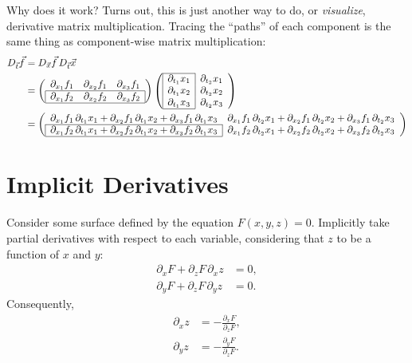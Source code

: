 \documentclass{multi}
\begin{document}
Why does it work? Turns out, this is just another way to do, or \emph{visualize}, derivative matrix multiplication. Tracing the ``paths'' of each component is the same thing as component-wise matrix multiplication:
\begin{align*}
    D_{\vec t}\vec f &= D_{\vec x}\vec f \, D_{\vec t} \vec x \\
    &=
    \left(\begin{array}{ccc}
        \partial_{x_1} f_1 & \partial_{x_2} f_1 & \partial_{x_3} f_1 \\ \hline
        \multicolumn{1}{|c}{\partial_{x_1} f_2} & \partial_{x_2} f_2 & \multicolumn{1}{c|}{\partial_{x_3} f_2} \\ \hline
    \end{array}\right)
    \left(\begin{array}{|c|c}
        \cline{1-1}
        \partial_{t_1} x_1 & \partial_{t_2} x_1 \\
        \partial_{t_1} x_2 & \partial_{t_2} x_2 \\
        \partial_{t_1} x_3 & \partial_{t_2} x_3 \\
        \cline{1-1}
    \end{array}\right) \\
    &=
    \left(\begin{array}{cc}
        \partial_{x_1} f_1 \, \partial_{t_1} x_1 + \partial_{x_2} f_1 \, \partial_{t_1} x_2 + \partial_{x_3} f_1 \, \partial_{t_1} x_3 &
        \partial_{x_1} f_1 \, \partial_{t_2} x_1 + \partial_{x_2} f_1 \, \partial_{t_2} x_2 + \partial_{x_3} f_1 \, \partial_{t_2} x_3 \\
        \cline{1-1}
        \multicolumn{1}{|c|}{\partial_{x_1} f_2 \, \partial_{t_1} x_1 + \partial_{x_2} f_2 \, \partial_{t_1} x_2 + \partial_{x_3} f_2 \, \partial_{t_1} x_3} &
        \partial_{x_1} f_2 \, \partial_{t_2} x_1 + \partial_{x_2} f_2 \, \partial_{t_2} x_2 + \partial_{x_3} f_2 \, \partial_{t_2} x_3 \\
        \cline{1-1}
    \end{array}\right)
\end{align*}


\section*{Implicit Derivatives}

Consider some surface defined by the equation \(F(x, y, z) = 0\). Implicitly take partial derivatives with respect to each variable, considering that \(z\) to be a function of \(x\) and \(y\):
\begin{align*}
    \partial_x F + \partial_z F \, \partial_x z &= 0, \\
    \partial_y F + \partial_z F \, \partial_y z &= 0.
\end{align*}
Consequently,
\begin{align*}
    \partial_x z &= -\frac{\partial_x F}{\partial_z F}, \\
    \partial_y z &= -\frac{\partial_y F}{\partial_z F}. \\
\end{align*}
\end{document}
